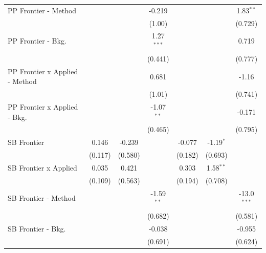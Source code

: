 \begin{tabular}{lcccccc}
   PP Frontier - Method           &               &               & -0.219        &               &              & 1.83$^{**}$\\   
                                  &               &               & (1.00)        &               &              & (0.729)\\   
   PP Frontier - Bkg.             &               &               & 1.27$^{***}$  &               &              & 0.719\\   
                                  &               &               & (0.441)       &               &              & (0.777)\\   
   PP Frontier x Applied - Method &               &               & 0.681         &               &              & -1.16\\   
                                  &               &               & (1.01)        &               &              & (0.741)\\   
   PP Frontier x Applied - Bkg.   &               &               & -1.07$^{**}$  &               &              & -0.171\\   
                                  &               &               & (0.465)       &               &              & (0.795)\\   
   SB Frontier                    & 0.146         & -0.239        &               & -0.077        & -1.19$^{*}$  &   \\   
                                  & (0.117)       & (0.580)       &               & (0.182)       & (0.693)      &   \\   
   SB Frontier x Applied          & 0.035         & 0.421         &               & 0.303         & 1.58$^{**}$  &   \\   
                                  & (0.109)       & (0.563)       &               & (0.194)       & (0.708)      &   \\   
   SB Frontier - Method           &               &               & -1.59$^{**}$  &               &              & -13.0$^{***}$\\   
                                  &               &               & (0.682)       &               &              & (0.581)\\   
   SB Frontier - Bkg.             &               &               & -0.038        &               &              & -0.955\\   
                                  &               &               & (0.691)       &               &              & (0.624)\\   

\end{tabular}
